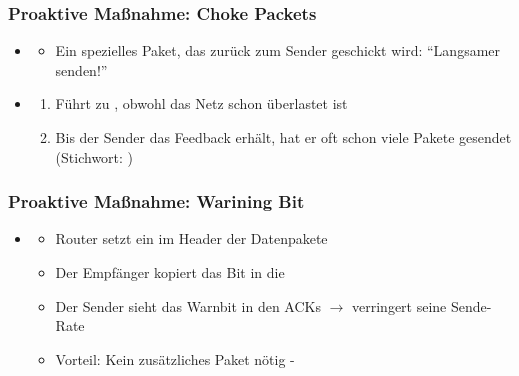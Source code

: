 \subsubsection*{Proaktive Maßnahme: Choke Packets}
\begin{itemize}
    \item {}
    \begin{itemize}
        \item Ein spezielles Paket, das zurück zum Sender geschickt wird: \enquote{Langsamer senden!}
    \end{itemize}
    \item {}
    \begin{enumerate}
        \item Führt zu , obwohl das Netz schon überlastet ist
        \item {} Bis der Sender das Feedback erhält, hat er oft schon viele Pakete gesendet (Stichwort: )
    \end{enumerate}
\end{itemize}
\subsubsection*{Proaktive Maßnahme: Warining Bit}
\begin{itemize}
    \item {}
    \begin{itemize}
        \item Router setzt ein  im Header der Datenpakete
        \item Der Empfänger kopiert das Bit in die 
        \item Der Sender sieht das Warnbit in den ACKs $\rightarrow$ verringert seine Sende-Rate
        \item Vorteil: Kein zusätzliches Paket nötig - 
    \end{itemize}
\end{itemize}
